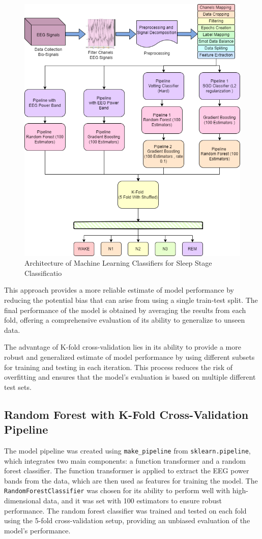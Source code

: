 \begin{figure}[H]
	\centering
	\includegraphics[width=0.6\linewidth]{"img/paper_1/k-FOLD.PNG"}
	\caption{Architecture of Machine Learning Classifiers for Sleep Stage
		Classificatio}
	\label{fig:architechture1}
\end{figure}



This approach provides a more reliable estimate of model performance by reducing the potential bias that can arise from using a single train-test split. The final performance of the model is obtained by averaging the results from each fold, offering a comprehensive evaluation of its ability to generalize to unseen data.

The advantage of K-fold cross-validation lies in its ability to provide a more robust and generalized estimate of model performance by using different subsets for training and testing in each iteration. This process reduces the risk of overfitting and ensures that the model's evaluation is based on multiple different test sets.

\subsection{Random Forest with K-Fold Cross-Validation Pipeline}

The model pipeline was created using \texttt{make\_pipeline} from \texttt{sklearn.pipeline}, which integrates two main components: a function transformer and a random forest classifier. The function transformer is applied to extract the EEG power bands from the data, which are then used as features for training the model. The \texttt{RandomForestClassifier} was chosen for its ability to perform well with high-dimensional data, and it was set with 100 estimators to ensure robust performance. The random forest classifier was trained and tested on each fold using the 5-fold cross-validation setup, providing an unbiased evaluation of the model’s performance.



